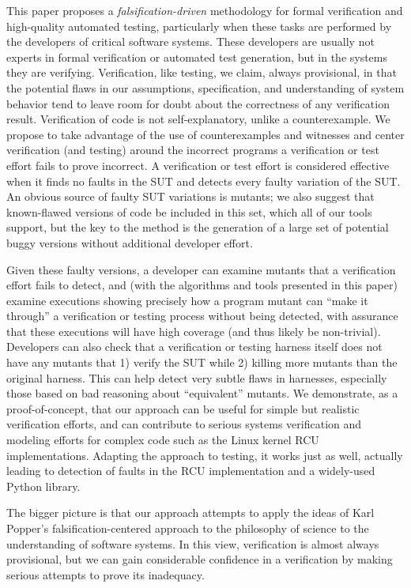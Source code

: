 \documentclass{svjour3}
\begin{document}
This paper proposes a \emph{falsification-driven} methodology for
formal verification and high-quality automated testing, particularly
when these tasks are performed by
the developers of critical software systems.  These developers are
usually not
experts in formal verification or automated test generation, but in the systems they are verifying.
Verification, like testing, we claim, always provisional, in that the potential
flaws in our assumptions, specification, and understanding of system
behavior tend to leave room for doubt about the correctness of any
verification result.  Verification of code is not self-explanatory,
unlike a counterexample.  We propose to take advantage of the use of
counterexamples and witnesses and center verification (and testing) around the
incorrect programs a verification or test effort fails to prove incorrect.  A
verification or test effort is considered effective when it finds no faults in the
SUT and detects every faulty variation of the SUT.  An
obvious source of faulty SUT variations is mutants; we also suggest that
known-flawed versions of code be included in this set, which all of
our tools support, but the key to the method is the generation of a
large set of potential buggy versions without additional developer
effort.  

Given
these faulty versions, a developer can examine mutants that a verification
effort fails to detect, and (with the algorithms and tools presented
in this paper) examine executions showing precisely how a program
mutant can ``make it through'' a verification or testing process without being detected,
with assurance that these executions will have high coverage (and thus
likely be non-trivial).  Developers can also check that a verification
or testing harness itself does not have any mutants that 1) verify the SUT while 2) killing
more mutants than the original harness.  This can help detect
very subtle flaws in harnesses, especially those based on bad
reasoning about ``equivalent'' mutants.  We demonstrate, as a
proof-of-concept, that our approach can be useful for simple but
realistic verification efforts, and can contribute to serious systems
verification and modeling efforts for complex code such as the Linux
kernel RCU implementations.  Adapting the approach to testing, it
works just as well, actually leading to detection of faults in the RCU
implementation and a widely-used Python library.

The bigger picture is that our approach
attempts to apply the ideas of Karl Popper's falsification-centered
approach to the philosophy of science to the understanding of software
systems.  In this view, verification is almost always provisional, but we can 
gain considerable confidence in a verification by making serious attempts to prove its inadequacy.
\end{document}
